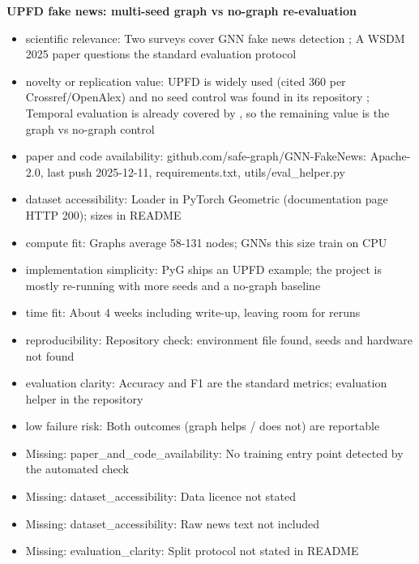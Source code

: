\documentclass[11pt,a4paper]{article}
\begin{document}
\textbf{UPFD fake news: multi-seed graph vs no-graph re-evaluation}
\begin{itemize}
\item scientific relevance: Two surveys cover GNN fake news detection \cite{phan2023fakesurvey,gong2023fakesurvey}; A WSDM 2025 paper questions the standard evaluation protocol \cite{kim2025dawn}
\item novelty or replication value: UPFD is widely used (cited 360 per Crossref/OpenAlex) and no seed control was found in its repository \cite{dou2021upfd}; Temporal evaluation is already covered by \cite{kim2025dawn}, so the remaining value is the graph vs no-graph control
\item paper and code availability: github.com/safe-graph/GNN-FakeNews: Apache-2.0, last push 2025-12-11, requirements.txt, utils/eval\_helper.py
\item dataset accessibility: Loader in PyTorch Geometric (documentation page HTTP 200); sizes in README
\item compute fit: Graphs average 58-131 nodes; GNNs this size train on CPU
\item implementation simplicity: PyG ships an UPFD example; the project is mostly re-running with more seeds and a no-graph baseline
\item time fit: About 4 weeks including write-up, leaving room for reruns
\item reproducibility: Repository check: environment file found, seeds and hardware not found
\item evaluation clarity: Accuracy and F1 are the standard metrics; evaluation helper in the repository
\item low failure risk: Both outcomes (graph helps / does not) are reportable
\item Missing: paper\_and\_code\_availability: No training entry point detected by the automated check
\item Missing: dataset\_accessibility: Data licence not stated
\item Missing: dataset\_accessibility: Raw news text not included
\item Missing: evaluation\_clarity: Split protocol not stated in README
\end{itemize}
\end{document}

